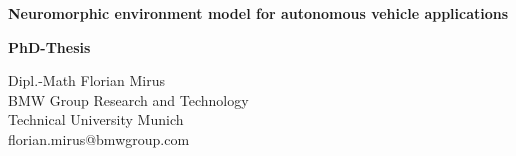 \begin{titlepage}

\begin{center}

\huge \textbf{Neuromorphic environment model for autonomous vehicle applications}

\vspace{1cm}

\Large \textbf{PhD-Thesis}

\vspace{1cm}

\normalsize


Dipl.-Math Florian Mirus \\
BMW Group Research and Technology \\
Technical University Munich \\
florian.mirus@bmwgroup.com

\vspace{2cm}
 

\end{center}
\end{titlepage}
